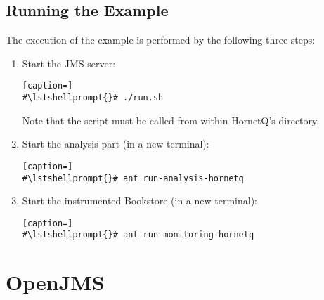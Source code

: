\setPropertiesListing


\setPropertiesListing


\setPropertiesListing


\subsection{Running the Example}

 The execution of the example is performed by the following three steps:
\begin{enumerate}
\item Start the JMS server:

\setBashListing
\begin{lstlisting}[caption=]
#\lstshellprompt{}# ./run.sh
\end{lstlisting}

Note that the script must be called from within HornetQ's  directory.

\item Start the analysis part (in a new terminal):
\setBashListing
\begin{lstlisting}[caption=]
#\lstshellprompt{}# ant run-analysis-hornetq
\end{lstlisting}
\item Start the instrumented Bookstore (in a new terminal):
\setBashListing
\begin{lstlisting}[caption=]
#\lstshellprompt{}# ant run-monitoring-hornetq
\end{lstlisting}
\end{enumerate}

\section{OpenJMS}\label{example:jms:openjms}

